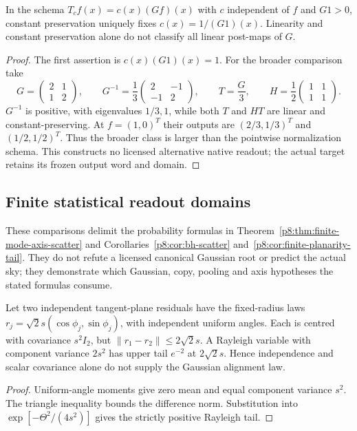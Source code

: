 \documentclass[12pt,a4paper]{article}
\begin{document}
\begin{proposition}
\label{p8:prop:v2187-linear-postmap-diagnostic}
In the schema $T_cf(x)=c(x)(Gf)(x)$ with $c$ independent of $f$ and $G1>0$,
constant preservation uniquely fixes $c(x)=1/(G1)(x)$.  Linearity and
constant preservation alone do not classify all linear post-maps of $G$.
\end{proposition}
\begin{proof}
The first assertion is $c(x)(G1)(x)=1$.  For the broader comparison take
\[
 G=\begin{pmatrix}2&1\\1&2\end{pmatrix},
 \qquad G^{-1}=\frac13\begin{pmatrix}2&-1\\-1&2\end{pmatrix},
 \qquad T=\frac G3,
 \qquad H=\frac12\begin{pmatrix}1&1\\1&1\end{pmatrix}.
\]
$G^{-1}$ is positive, with eigenvalues $1/3,1$, while both $T$ and $HT$ are
linear and constant-preserving.  At $f=(1,0)^T$ their outputs are
$(2/3,1/3)^T$ and $(1/2,1/2)^T$.  Thus the broader class is larger than the
pointwise normalization schema.  This constructs no licensed alternative
native readout; the actual target retains its frozen output word and domain.
\end{proof}

\subsection{Finite statistical readout domains}
\label{p8:app:v2187-finite-statistical-domains}
These comparisons delimit the probability formulas in
Theorem~\ref{p8:thm:finite-mode-axis-scatter} and
Corollaries~\ref{p8:cor:bh-scatter} and~\ref{p8:cor:finite-planarity-tail}.
They do not refute a licensed canonical Gaussian root or predict the actual
sky; they demonstrate which Gaussian, copy, pooling and axis hypotheses the
stated formulas consume.

\begin{proposition}
\label{p8:prop:v2187-nongaussian-axis-diagnostic}
Let two independent tangent-plane residuals have the fixed-radius laws
$r_j=\sqrt2s(\cos\phi_j,\sin\phi_j)$, with independent uniform angles.
Each is centred with covariance $s^2I_2$, but $\|r_1-r_2\|\le2\sqrt2s$.
A Rayleigh variable with component variance $2s^2$ has upper tail $e^{-2}$
at $2\sqrt2s$.  Hence independence and scalar covariance alone do not
supply the Gaussian alignment law.
\end{proposition}
\begin{proof}
Uniform-angle moments give zero mean and equal component variance $s^2$.
The triangle inequality bounds the difference norm.  Substitution into
$\exp[-\Theta^2/(4s^2)]$ gives the strictly positive Rayleigh tail.
\end{proof}
\end{document}

